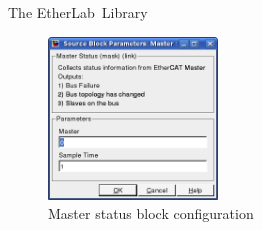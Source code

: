 \begin{ighsec}{The EtherLab\regTM\ Library}
\begin{figure}[H]
  \begin{center}
    \includegraphics[width=0.4\textwidth]{images/master.png}
    \caption{Master status block configuration}
    \label{fig:masterstats}
  \end{center}
\end{figure}

\end{ighsec}



